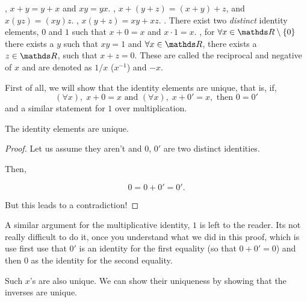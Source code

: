 \begin{axioms}
    \ii {}, \(x+y = y+x\) and \(xy = yx\).
    \ii {}, \(x + (y+z) = (x+y) + z\), and \(x(yz) = (xy)z\).
    \ii {}, \(x(y + z) = xy + xz\).
    \ii {}. There exist two \emph{distinct} identity elements, \(0\) and \(1\) such that \(x + 0 = x\) and \(x \cdot 1 = x\).
    \ii {}, for \(\forall x \in \RR \setminus \{0\}\) there exists a \(y\) such that \(xy = 1\) and \(\forall x \in \RR\),
    there exists a \(z \in \RR\), such that \(x + z = 0\). These are called the reciprocal 
    and negative of \(x\) and are denoted as \(1/x\)  (\(x^{-1}\)) and \(-x\).
\end{axioms}
 
First of all, we will show that the identity elements are unique, that is, if,
\begin{equation*}
    (\forall x),\; x + 0 = x \text{ and } (\forall x),\; x + 0' = x, \text{ then } 0 = 0'
\end{equation*}
and a similar statement for \(1\) over multiplication.

\begin{proposition}
    The identity elements are unique.
\end{proposition}

\begin{proof}
    Let us assume they aren't and \(0\), \(0'\) are two distinct identities.

    Then, 

    \begin{equation*}
        0 = 0 + 0' = 0'.
    \end{equation*}

    But this leads to a contradiction! \lightning
\end{proof}


A similar argument for the multiplicative identity, \(1\) is left to the reader. Its 
not really difficult to do it, once you understand what we did in this proof, which is 
use first use that \(0'\) is an identity for the first equality (so that \(0 + 0' = 0\)) 
and then \(0\) as the identity for the second equality. 

Such \(x\)'s are also unique. We can show their uniqueness by showing that the inverses are unique.

